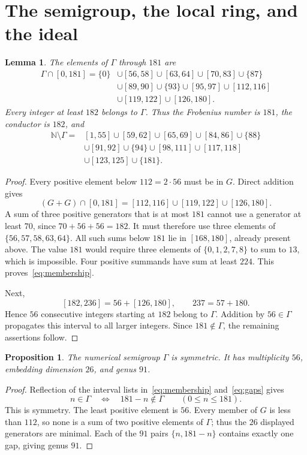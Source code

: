 \documentclass[11pt,letterpaper]{article}
\newtheorem{proposition}[theorem]{Proposition}
\newtheorem{lemma}[theorem]{Lemma}
\theoremstyle{remark}
\newcommand{\NN}{\mathbb N}
\numberwithin{equation}{section}
\begin{document}
\section{The semigroup, the local ring, and the ideal}\label{sec:ring}
\begin{lemma}\label{lem:membership}
The elements of $\Gamma$ through $181$ are
\begin{equation}\label{eq:membership}
\begin{split}
\Gamma\cap[0,181]=\{0\}&\cup[56,58]\cup[63,64]\cup[70,83]\cup\{87\}\\
&\cup[89,90]\cup\{93\}\cup[95,97]\cup[112,116]\\
&\cup[119,122]\cup[126,180].
\end{split}
\end{equation}
Every integer at least $182$ belongs to $\Gamma$. Thus the Frobenius number is $181$, the conductor is $182$, and
\begin{equation}\label{eq:gaps}
\begin{split}
\NN\setminus\Gamma={}&[1,55]\cup[59,62]\cup[65,69]\cup[84,86]\cup\{88\}\\
&\cup[91,92]\cup\{94\}\cup[98,111]\cup[117,118]\\
&\cup[123,125]\cup\{181\}.
\end{split}
\end{equation}
\end{lemma}
\begin{proof}
Every positive element below $112=2\cdot56$ must be in $G$. Direct addition gives
\[
 (G+G)\cap[0,181]=[112,116]\cup[119,122]\cup[126,180].
\]
A sum of three positive generators that is at most $181$ cannot use a generator at least $70$, since $70+56+56=182$. It must therefore use three elements of $\{56,57,58,63,64\}$. All such sums below $181$ lie in $[168,180]$, already present above. The value $181$ would require three elements of $\{0,1,2,7,8\}$ to sum to $13$, which is impossible. Four positive summands have sum at least $224$. This proves~\eqref{eq:membership}.

Next,
\[
 [182,236]=56+[126,180],\qquad 237=57+180.
\]
Hence $56$ consecutive integers starting at $182$ belong to $\Gamma$. Addition by $56\in\Gamma$ propagates this interval to all larger integers. Since $181\notin\Gamma$, the remaining assertions follow.
\end{proof}

\begin{proposition}\label{prop:symmetry}
The numerical semigroup $\Gamma$ is symmetric. It has multiplicity $56$, embedding dimension $26$, and genus $91$.
\end{proposition}
\begin{proof}
Reflection of the interval lists in~\eqref{eq:membership} and~\eqref{eq:gaps} gives
\[
 n\in\Gamma\quad\Longleftrightarrow\quad181-n\notin\Gamma
 \qquad(0\leq n\leq181).
\]
This is symmetry. The least positive element is $56$. Every member of $G$ is less than $112$, so none is a sum of two positive elements of $\Gamma$; thus the $26$ displayed generators are minimal. Each of the $91$ pairs $\{n,181-n\}$ contains exactly one gap, giving genus $91$.
\end{proof}
\end{document}

